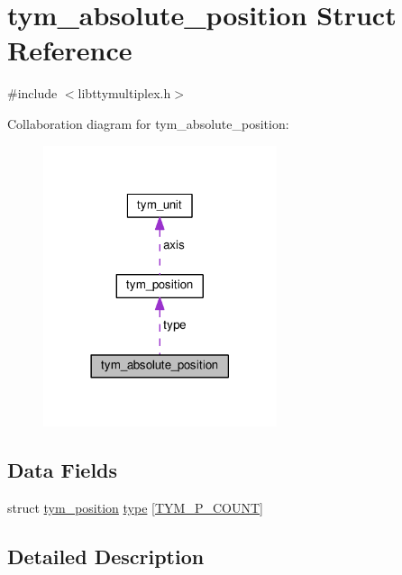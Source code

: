 \hypertarget{structtym__absolute__position}{}\section{tym\+\_\+absolute\+\_\+position Struct Reference}
\label{structtym__absolute__position}


{\ttfamily \#include $<$libttymultiplex.\+h$>$}



Collaboration diagram for tym\+\_\+absolute\+\_\+position\+:
\nopagebreak
\begin{figure}[H]
\begin{center}
\leavevmode
\includegraphics[width=194pt]{structtym__absolute__position__coll__graph}
\end{center}
\end{figure}
\subsection*{Data Fields}
\begin{DoxyCompactItemize}
\item 
struct \hyperlink{structtym__position}{tym\+\_\+position} \hyperlink{structtym__absolute__position_ad80b2993d316f7f166dc1761c1ae65b2}{type} \mbox{[}\hyperlink{libttymultiplex_8h_a23b539c9dc1c137633f8783517fc2653a483bfa59d0a2b43731d992c418a42db7}{T\+Y\+M\+\_\+\+P\+\_\+\+C\+O\+U\+NT}\mbox{]}
\end{DoxyCompactItemize}


\subsection{Detailed Description}



